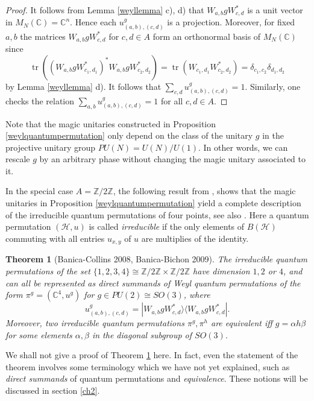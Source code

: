\documentclass[a4paper]{amsart}
\newcommand*{\Hc}{\mathcal{H}}
\newcommand*{\ket}{\rangle}
\newcommand*{\bra}{\langle}
\DeclareMathOperator{\tr}{tr}
\numberwithin{equation}{section}
\theoremstyle{change}
\newtheorem{theorem}{Theorem}[section]
\begin{document}
\begin{proof} 
It follows from Lemma \ref{weyllemma} c), d) that $ W_{a,b} g W_{c,d}^* $ is a unit vector in $ M_N(\mathbb{C}) = \mathbb{C}^n $. Hence each $ u^g_{(a,b),(c,d)} $ is a projection. 
Moreover, for fixed $ a,b $ the matrices $ W_{a,b} g W_{c,d}^* $ for $ c, d \in A $ form an orthonormal basis of $ M_N(\mathbb{C}) $ since 
$$
\tr((W_{a,b} g W_{c_1,d_1}^*)^* W_{a,b} g W_{c_2,d_2}^*) 
= \tr(W_{c_1,d_1} W_{c_2,d_2}^*) = \delta_{c_1, c_2} \delta_{d_1, d_2} 
$$
by Lemma \ref{weyllemma} d). 
It follows that $ \sum_{c,d} u^g_{(a,b), (c,d)} = 1 $. Similarly, one checks the relation $ \sum_{a,b} u^g_{(a,b), (c,d)} = 1 $ for all $ c,d \in A $. 
\end{proof} 

Note that the magic unitaries constructed in Proposition \ref{weylquantumpermutation} only depend on the class of the unitary $ g $ in the projective unitary group $ PU(N) = U(N)/U(1) $. In other words, we can rescale $ g $ by an arbitrary phase without changing the magic unitary associated to it. 

In the special case $ A = \mathbb{Z}/2 \mathbb{Z} $, the following result from \cite{BANICA_COLLINS_pauli}, \cite{BANICA_BICHON_fourpoints} shows that the magic unitaries in Proposition \ref{weylquantumpermutation} yield a complete description of the irreducible quantum 
permutations of four points, see also \cite[Lemma 5.4]{VOIGT_infinitequantumpermutations}. Here a quantum permutation $ (\Hc, u) $ is called \emph{irreducible} if the only elements of $ B(\Hc) $ 
commuting with all entries $ u_{x,y} $ of $ u $ are multiplies of the identity. 

\begin{theorem}[Banica-Collins 2008, Banica-Bichon 2009] \label{BBfourpoints}
The irreducible quantum permutations of the set $ \{1,2,3,4\} \cong \mathbb{Z}/2\mathbb{Z} \times \mathbb{Z}/2 \mathbb{Z} $ have dimension $ 1,2 $ or $ 4 $, and can all be represented as direct summands of Weyl 
quantum permutations of the form $ \pi^g = (\mathbb{C}^4, u^g) $ for $ g \in PU(2) \cong SO(3) $, where 
$$
u^g_{(a,b),(c,d)} = |W_{a,b} g W_{c,d}^* \ket \bra W_{a,b} g W_{c,d}^*|.
$$
Moreover, two irreducible quantum permutations $ \pi^g, \pi^h $ are equivalent iff $ g = \alpha h \beta $ for some elements $ \alpha, \beta $ in the diagonal subgroup of $ SO(3) $. 
\end{theorem} 

We shall not give a proof of Theorem \ref{BBfourpoints} here. In fact, even the statement of the theorem involves some terminology which we have not yet explained, such as \emph{direct summands} of quantum permutations and \emph{equivalence}. These notions will be discussed in section \ref{ch2}.
\end{document}
